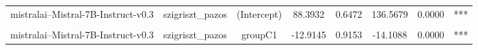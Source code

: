 \begin{table}[!h]
{\begin{tabular}{lccccccc}
mistralai--Mistral-7B-Instruct-v0.3 & szigriszt_pazos & (Intercept) & 88.3932 & 0.6472 & 136.5679 & 0.0000 & ***\\
\addlinespace
\cellcolor{gray!10}{mistralai--Mistral-7B-Instruct-v0.3} & \cellcolor{gray!10}{szigriszt_pazos} & \cellcolor{gray!10}{groupB1} & \cellcolor{gray!10}{-5.4730} & \cellcolor{gray!10}{0.9153} & \cellcolor{gray!10}{-5.9792} & \cellcolor{gray!10}{0.0000} & \cellcolor{gray!10}{***}\\
mistralai--Mistral-7B-Instruct-v0.3 & szigriszt_pazos & groupC1 & -12.9145 & 0.9153 & -14.1088 & 0.0000 & ***\\
\bottomrule
\end{tabular}}
\end{table}
